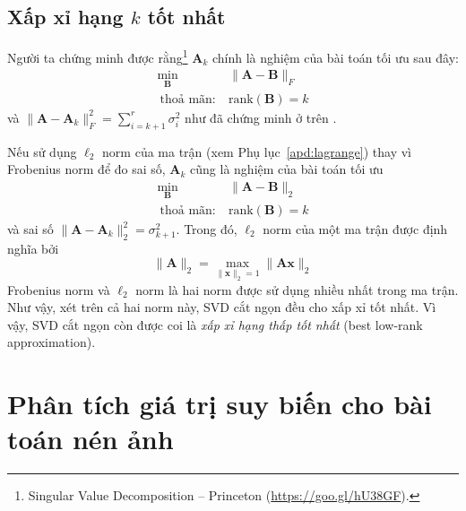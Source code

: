 \subsection{Xấp xỉ hạng $k$ tốt nhất}

Người ta chứng minh được rằng\footnote{Singular Value Decomposition  --
Princeton (\url{https://goo.gl/hU38GF}).}
$\mathbf{A}_k$ chính là nghiệm của bài toán tối ưu sau đây:
\begin{equation}
\label{eqn:26_17}
\begin{aligned}
\min_{\mathbf{B}} &\|\mathbf{A} - \mathbf{B}\|_F \\\
\text{thoả mãn:}~ & \text{rank}(\mathbf{B}) = k
\end{aligned}
\end{equation}
và $\|\mathbf{A} - \mathbf{A}_k\|_F^2 = \sum_{i = k + 1}^r \sigma_i^2$ như đã chứng minh ở trên .

Nếu sử dụng $\ell_2$ norm của ma trận (xem Phụ lục~\ref{apd:lagrange}) thay vì
Frobenius norm để đo
sai số,
$\mathbf{A}_k$ cũng là nghiệm của bài toán tối ưu
\begin{equation}
\begin{aligned}
\min_{\mathbf{B}} &\|\mathbf{A} - \mathbf{B}\|_2 \\\
\text{thoả mãn:}~ & \text{rank}(\mathbf{B}) = k
\end{aligned}
\end{equation}
và sai số $\|\mathbf{A} - \mathbf{A}_k\|_2^2 = \sigma_{k+1}^2$. Trong đó, $\ell_2$ norm
của một ma trận được định nghĩa bởi
\begin{equation}
\|\mathbf{A}\|_2 = \max_{\|\mathbf{x}\|_2 = 1} \|\mathbf{Ax}\|_2
\end{equation}
Frobenius norm và $\ell_2$ norm là hai norm được sử dụng nhiều nhất trong ma
trận. Như vậy, xét trên cả hai norm này, SVD cắt ngọn đều cho xấp xỉ tốt nhất.
Vì vậy, SVD cắt ngọn còn được coi là \textit{xấp xỉ hạng thấp tốt nhất} ({best low-rank approximation}).



\section{Phân tích giá trị suy biến cho bài toán nén ảnh}


